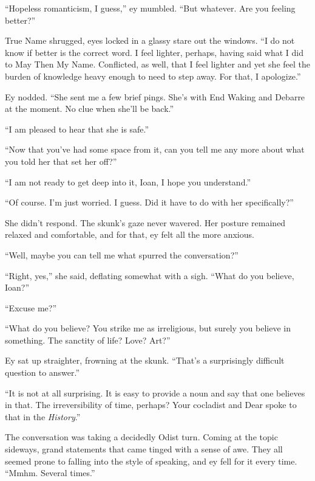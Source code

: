 ``Hopeless romanticism, I guess,'' ey mumbled. ``But whatever. Are you feeling better?''

True Name shrugged, eyes locked in a glassy stare out the windows. ``I do not know if better is the correct word. I feel lighter, perhaps, having said what I did to May Then My Name. Conflicted, as well, that I feel lighter and yet she feel the burden of knowledge heavy enough to need to step away. For that, I apologize.''

Ey nodded. ``She sent me a few brief pings. She's with End Waking and Debarre at the moment. No clue when she'll be back.''

``I am pleased to hear that she is safe.''

``Now that you've had some space from it, can you tell me any more about what you told her that set her off?''

``I am not ready to get deep into it, Ioan, I hope you understand.''

``Of course. I'm just worried. I guess. Did it have to do with her specifically?''

She didn't respond. The skunk's gaze never wavered. Her posture remained relaxed and comfortable, and for that, ey felt all the more anxious.

``Well, maybe you can tell me what spurred the conversation?''

``Right, yes,'' she said, deflating somewhat with a sigh. ``What do you believe, Ioan?''

``Excuse me?''

``What do you believe? You strike me as irreligious, but surely you believe in something. The sanctity of life? Love? Art?''

Ey sat up straighter, frowning at the skunk. ``That's a surprisingly difficult question to answer.''

``It is not at all surprising. It is easy to provide a noun and say that one believes in that. The irreversibility of time, perhaps? Your cocladist and Dear spoke to that in the \emph{History}.''

The conversation was taking a decidedly Odist turn. Coming at the topic sideways, grand statements that came tinged with a sense of awe. They all seemed prone to falling into the style of speaking, and ey fell for it every time. ``Mmhm. Several times.''

